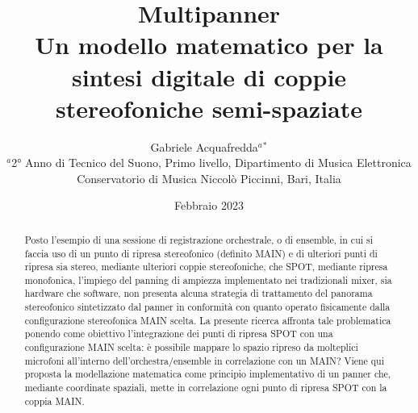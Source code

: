 \documentclass{article}
\title{Multipanner \\ Un modello matematico per la sintesi digitale di coppie stereofoniche semi-spaziate}
\author{Gabriele Acquafredda$^{a}$$^{*}$ \\
    \small $^{a}$2° Anno di Tecnico del Suono, Primo livello, Dipartimento di Musica Elettronica\\
    \small  Conservatorio di Musica Niccolò Piccinni, Bari, Italia\\
}
\date{Febbraio 2023}
\begin{document}
\maketitle

\begin{abstract} 
    \noindent Posto l'esempio di una sessione di registrazione orchestrale, o di ensemble, in cui si faccia uso di un punto di ripresa stereofonico (definito MAIN) e di ulteriori punti di ripresa sia stereo, mediante ulteriori coppie stereofoniche, che SPOT, mediante ripresa monofonica, l'impiego del panning di ampiezza implementato nei tradizionali mixer, sia hardware che software, non presenta alcuna strategia di trattamento del panorama stereofonico sintetizzato dal panner in conformità con quanto operato fisicamente dalla configurazione stereofonica MAIN scelta. La presente ricerca affronta tale problematica ponendo come obiettivo l'integrazione dei punti di ripresa SPOT con una configurazione MAIN scelta: è possibile mappare lo spazio ripreso da molteplici microfoni all'interno dell'orchestra/ensemble in correlazione con un MAIN? Viene qui proposta la modellazione matematica come principio implementativo di un panner che, mediante coordinate spaziali, mette in correlazione ogni punto di ripresa SPOT con la coppia MAIN.
\end{abstract}
\end{document}
